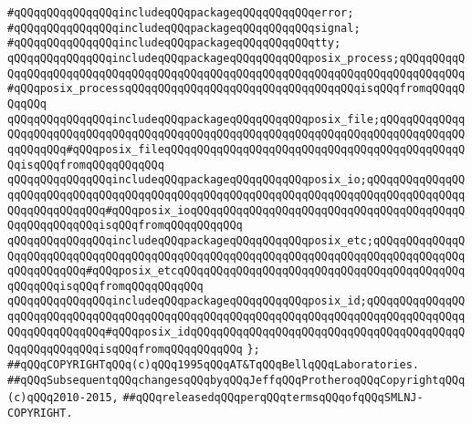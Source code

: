 \newline
\verb|#qQQqqQQqqQQqqQQqincludeqQQqpackageqQQqqQQqqQQqerror;|\newline
\verb|#qQQqqQQqqQQqqQQqincludeqQQqpackageqQQqqQQqqQQqsignal;|\newline
\verb|#qQQqqQQqqQQqqQQqincludeqQQqpackageqQQqqQQqqQQqtty;|\newline
\verb|qQQqqQQqqQQqqQQqincludeqQQqpackageqQQqqQQqqQQqposix_process;qQQqqQQqqQQqqQQqqQQqqQQqqQQqqQQqqQQqqQQqqQQqqQQqqQQqqQQqqQQqqQQqqQQqqQQqqQQqqQQq#qQQqposix_processqQQqqQQqqQQqqQQqqQQqqQQqqQQqqQQqqQQqisqQQqfromqQQqqQQqqQQq|\newline
\verb|qQQqqQQqqQQqqQQqincludeqQQqpackageqQQqqQQqqQQqposix_file;qQQqqQQqqQQqqQQqqQQqqQQqqQQqqQQqqQQqqQQqqQQqqQQqqQQqqQQqqQQqqQQqqQQqqQQqqQQqqQQqqQQqqQQqqQQq#qQQqposix_fileqQQqqQQqqQQqqQQqqQQqqQQqqQQqqQQqqQQqqQQqqQQqqQQqisqQQqfromqQQqqQQqqQQq|\newline
\verb|qQQqqQQqqQQqqQQqincludeqQQqpackageqQQqqQQqqQQqposix_io;qQQqqQQqqQQqqQQqqQQqqQQqqQQqqQQqqQQqqQQqqQQqqQQqqQQqqQQqqQQqqQQqqQQqqQQqqQQqqQQqqQQqqQQqqQQqqQQqqQQq#qQQqposix_ioqQQqqQQqqQQqqQQqqQQqqQQqqQQqqQQqqQQqqQQqqQQqqQQqqQQqqQQqisqQQqfromqQQqqQQqqQQq|\newline
\verb|qQQqqQQqqQQqqQQqincludeqQQqpackageqQQqqQQqqQQqposix_etc;qQQqqQQqqQQqqQQqqQQqqQQqqQQqqQQqqQQqqQQqqQQqqQQqqQQqqQQqqQQqqQQqqQQqqQQqqQQqqQQqqQQqqQQqqQQqqQQq#qQQqposix_etcqQQqqQQqqQQqqQQqqQQqqQQqqQQqqQQqqQQqqQQqqQQqqQQqqQQqisqQQqfromqQQqqQQqqQQq|\newline
\verb|qQQqqQQqqQQqqQQqincludeqQQqpackageqQQqqQQqqQQqposix_id;qQQqqQQqqQQqqQQqqQQqqQQqqQQqqQQqqQQqqQQqqQQqqQQqqQQqqQQqqQQqqQQqqQQqqQQqqQQqqQQqqQQqqQQqqQQqqQQqqQQq#qQQqposix_idqQQqqQQqqQQqqQQqqQQqqQQqqQQqqQQqqQQqqQQqqQQqqQQqqQQqqQQqisqQQqfromqQQqqQQqqQQq|\newline
\verb|};|\newline
\newline
\newline
\newline
\newline
\verb|##qQQqCOPYRIGHTqQQq(c)qQQq1995qQQqAT&TqQQqBellqQQqLaboratories.|\newline
\verb|##qQQqSubsequentqQQqchangesqQQqbyqQQqJeffqQQqProtheroqQQqCopyrightqQQq(c)qQQq2010-2015,|\newline
\verb|##qQQqreleasedqQQqperqQQqtermsqQQqofqQQqSMLNJ-COPYRIGHT.|\newline

